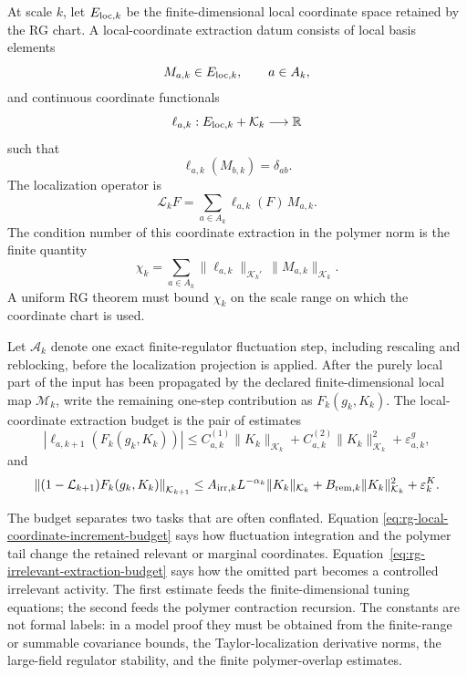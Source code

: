 \begin{definition}
\label{def:rg-local-coordinate-extraction-budget}
At scale \(k\), let \(E_{{\rm loc},k}\) be the finite-dimensional local
coordinate space retained by the RG chart.  A local-coordinate extraction
datum consists of local basis elements
\[
  M_{a,k}\in E_{{\rm loc},k},\qquad a\in A_k,
\]
and continuous coordinate functionals
\[
  \ell_{a,k}:E_{{\rm loc},k}+\mathcal K_k\longrightarrow\mathbb R
\]
such that
\begin{equation}
  \ell_{a,k}(M_{b,k})=\delta_{ab}.
  \label{eq:rg-local-biorthogonal-coordinate-system}
\end{equation}
The localization operator is
\[
  \mathcal L_kF=\sum_{a\in A_k}\ell_{a,k}(F)\,M_{a,k}.
\]
The condition number of this coordinate extraction in the polymer norm is
the finite quantity
\begin{equation}
  \chi_k
  =
  \sum_{a\in A_k}
  \|\ell_{a,k}\|_{\mathcal K_k'}\,\|M_{a,k}\|_{\mathcal K_k}.
  \label{eq:rg-local-coordinate-condition-number}
\end{equation}
A uniform RG theorem must bound \(\chi_k\) on the scale range on which the
coordinate chart is used.

Let \(\mathcal A_k\) denote one exact finite-regulator fluctuation step,
including rescaling and reblocking, before the localization projection is
applied.  After the purely local part of the input has been propagated by
the declared finite-dimensional local map \(\mathcal M_k\), write the
remaining one-step contribution as \(F_k(g_k,K_k)\).  The local-coordinate
extraction budget is the pair of estimates
\begin{equation}
  \left|
    \ell_{a,k+1}\!\left(F_k(g_k,K_k)\right)
  \right|
  \le
  C^{(1)}_{a,k}\|K_k\|_{\mathcal K_k}
  +C^{(2)}_{a,k}\|K_k\|_{\mathcal K_k}^{2}
  +\varepsilon^g_{a,k},
  \label{eq:rg-local-coordinate-increment-budget}
\end{equation}
and
\begin{equation}
  \left\|
    (1-\mathcal L_{k+1})F_k(g_k,K_k)
  \right\|_{\mathcal K_{k+1}}
  \le
  A_{{\rm irr},k}L^{-\alpha_k}\|K_k\|_{\mathcal K_k}
  +B_{{\rm rem},k}\|K_k\|_{\mathcal K_k}^{2}
  +\varepsilon^K_k .
  \label{eq:rg-irrelevant-extraction-budget}
\end{equation}
\end{definition}

The budget separates two tasks that are often conflated.  Equation
\eqref{eq:rg-local-coordinate-increment-budget} says how fluctuation
integration and the polymer tail change the retained relevant or marginal
coordinates.  Equation~\eqref{eq:rg-irrelevant-extraction-budget} says how
the omitted part becomes a controlled irrelevant activity.  The first
estimate feeds the finite-dimensional tuning equations; the second feeds the
polymer contraction recursion.  The constants are not formal labels: in a
model proof they must be obtained from the finite-range or summable
covariance bounds, the Taylor-localization derivative norms, the large-field
regulator stability, and the finite polymer-overlap estimates.

